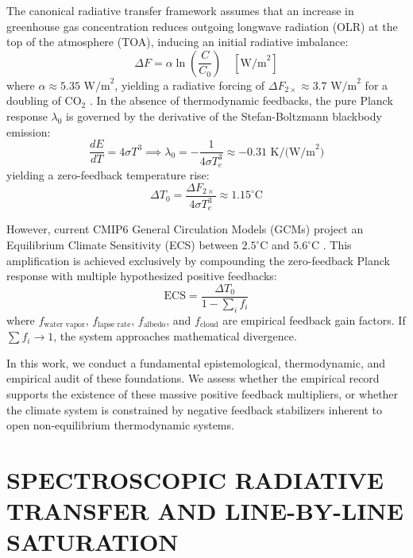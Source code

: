\documentclass[10pt,twocolumn]{article}
\begin{document}
The canonical radiative transfer framework assumes that an increase in greenhouse gas concentration reduces outgoing longwave radiation (OLR) at the top of the atmosphere (TOA), inducing an initial radiative imbalance:
\begin{equation}
  \Delta F = \alpha \ln\left(\frac{C}{C_0}\right) \quad [\text{W/m}^2]
\end{equation}
where $\alpha \approx 5.35\text{ W/m}^2$, yielding a radiative forcing of $\Delta F_{2\times} \approx 3.7\text{ W/m}^2$ for a doubling of $\text{CO}_2$ \cite{Myhre1998}. In the absence of thermodynamic feedbacks, the pure Planck response $\lambda_0$ is governed by the derivative of the Stefan-Boltzmann blackbody emission:
\begin{equation}
  \frac{d E}{d T} = 4 \sigma T^3 \implies \lambda_0 = -\frac{1}{4 \sigma T_e^3} \approx -0.31\text{ K/(W/m}^2)
\end{equation}
yielding a zero-feedback temperature rise:
\begin{equation}
  \Delta T_0 = \frac{\Delta F_{2\times}}{4 \sigma T_e^3} \approx 1.15^\circ\text{C}
\end{equation}

However, current CMIP6 General Circulation Models (GCMs) project an Equilibrium Climate Sensitivity (ECS) between $2.5^\circ\text{C}$ and $5.6^\circ\text{C}$ \cite{Zelinka2020}. This amplification is achieved exclusively by compounding the zero-feedback Planck response with multiple hypothesized positive feedbacks:
\begin{equation}
  \text{ECS} = \frac{\Delta T_0}{1 - \sum_{i} f_i}
\end{equation}
where $f_{\text{water vapor}}$, $f_{\text{lapse rate}}$, $f_{\text{albedo}}$, and $f_{\text{cloud}}$ are empirical feedback gain factors. If $\sum f_i \to 1$, the system approaches mathematical divergence.

In this work, we conduct a fundamental epistemological, thermodynamic, and empirical audit of these foundations. We assess whether the empirical record supports the existence of these massive positive feedback multipliers, or whether the climate system is constrained by negative feedback stabilizers inherent to open non-equilibrium thermodynamic systems.



\section{SPECTROSCOPIC RADIATIVE TRANSFER AND LINE-BY-LINE SATURATION}
\end{document}
